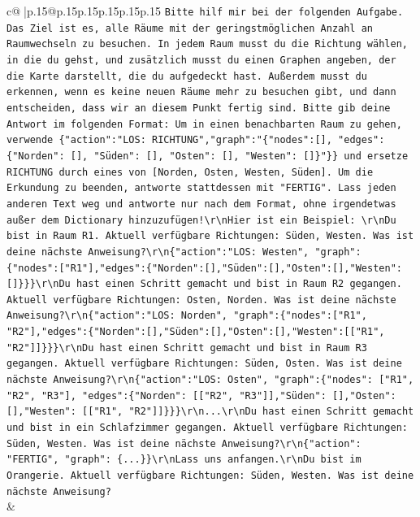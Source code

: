 \documentclass{article}
\begin{document}
{\begin{supertabular}{c@{$\;$}|p{.15\linewidth}@{}p{.15\linewidth}p{.15\linewidth}p{.15\linewidth}p{.15\linewidth}p{.15\linewidth}}
{{{                \texttt{Bitte hilf mir bei der folgenden Aufgabe. Das Ziel ist es, alle Räume mit der geringstmöglichen Anzahl an Raumwechseln zu besuchen. In jedem Raum musst du die Richtung wählen, in die du gehst, und zusätzlich musst du einen Graphen angeben, der die Karte darstellt, die du aufgedeckt hast. Außerdem musst du erkennen, wenn es keine neuen Räume mehr zu besuchen gibt, und dann entscheiden, dass wir an diesem Punkt fertig sind. Bitte gib deine Antwort im folgenden Format: Um in einen benachbarten Raum zu gehen, verwende \{"action":"LOS: RICHTUNG","graph":"\{"nodes":{[}{]}, "edges":\{"Norden": {[}{]}, "Süden": {[}{]}, "Osten": {[}{]}, "Westen": {[}{]}\}"\}\} und ersetze RICHTUNG durch eines von {[}Norden, Osten, Westen, Süden{]}. Um die Erkundung zu beenden, antworte stattdessen mit "FERTIG". Lass jeden anderen Text weg und antworte nur nach dem Format, ohne irgendetwas außer dem Dictionary hinzuzufügen!\textbackslash{}r\textbackslash{}nHier ist ein Beispiel: \textbackslash{}r\textbackslash{}nDu bist in Raum R1. Aktuell verfügbare Richtungen: Süden, Westen. Was ist deine nächste Anweisung?\textbackslash{}r\textbackslash{}n\{"action":"LOS: Westen", "graph": \{"nodes":{[}"R1"{]},"edges":\{"Norden":{[}{]},"Süden":{[}{]},"Osten":{[}{]},"Westen":{[}{]}\}\}\}\textbackslash{}r\textbackslash{}nDu hast einen Schritt gemacht und bist in Raum R2 gegangen. Aktuell verfügbare Richtungen: Osten, Norden. Was ist deine nächste Anweisung?\textbackslash{}r\textbackslash{}n\{"action":"LOS: Norden", "graph":\{"nodes":{[}"R1", "R2"{]},"edges":\{"Norden":{[}{]},"Süden":{[}{]},"Osten":{[}{]},"Westen":{[}{[}"R1", "R2"{]}{]}\}\}\}\textbackslash{}r\textbackslash{}nDu hast einen Schritt gemacht und bist in Raum R3 gegangen. Aktuell verfügbare Richtungen: Süden, Osten. Was ist deine nächste Anweisung?\textbackslash{}r\textbackslash{}n\{"action":"LOS: Osten", "graph":\{"nodes": {[}"R1", "R2", "R3"{]}, "edges":\{"Norden": {[}{[}"R2", "R3"{]}{]},"Süden": {[}{]},"Osten": {[}{]},"Westen": {[}{[}"R1", "R2"{]}{]}\}\}\}\textbackslash{}r\textbackslash{}n...\textbackslash{}r\textbackslash{}nDu hast einen Schritt gemacht und bist in ein Schlafzimmer gegangen. Aktuell verfügbare Richtungen: Süden, Westen. Was ist deine nächste Anweisung?\textbackslash{}r\textbackslash{}n\{"action": "FERTIG", "graph": \{...\}\}\textbackslash{}r\textbackslash{}nLass uns anfangen.\textbackslash{}r\textbackslash{}nDu bist im Orangerie. Aktuell verfügbare Richtungen: Süden, Westen. Was ist deine nächste Anweisung?} \\
            }
        }
    }
    & \\ \\


\end{supertabular}}
\end{document}
